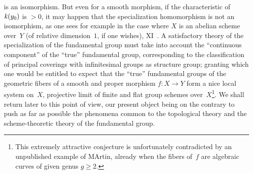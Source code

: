 \begin{remarks}
is an isomorphism. But even for a smooth morphism, if the
characteristic of~$\mathit{k}(y_0)$ is $>0$, it may happen that
the specialization homomorphism is not an isomorphism,
as one sees for example in the case where $X$ is an abelian
scheme over~$Y$ (of relative dimension~$1$, if one wishes),
\cf XI~.
A satisfactory theory of the
specialization of the fundamental group must take into account the
``continuous component'' of the ``true'' fundamental group, corresponding
to the classification of principal coverings with
infinitesimal groups as structure group; granting which one would be
entitled to expect that the ``true'' fundamental groups of the
geometric fibers of a smooth and proper morphism $f\colon
X\to Y$ form a nice local system on~$X$, projective limit
of finite and flat group schemes over~$X$\kern1pt\footnote{This
extremely attractive conjecture is unfortunately contradicted
by an unpublished example of M\ptbl Artin, already when
the fibers of~$f$ are algebraic curves of given genus
$g\ge 2$.}. We shall return later to this point of view,
our present object being on the contrary to push as far
as possible the phenomena common to the topological
theory and the scheme-theoretic theory of the fundamental group.
\end{remarks}

